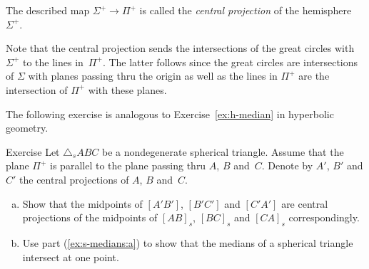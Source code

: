 The described map $\Sigma^+\to \Pi^+$ is called the \emph{central projection} of 
the hemisphere~$\Sigma^+$.

Note that the central projection sends the intersections of the great circles with $\Sigma^+$ to the lines in~$\Pi^+$.
The latter follows since the great circles are intersections of $\Sigma$ with planes passing thru the origin
as well as the lines in $\Pi^+$ are the intersection of $\Pi^+$ with these planes.

The following exercise 
is analogous to Exercise~\ref{ex:h-median}
in hyperbolic geometry.

\begin{thm}{Exercise}\label{ex:s-medians}
Let $\triangle_sABC$ be a nondegenerate spherical triangle.
Assume that the plane $\Pi^+$ is parallel to the plane passing thru $A$, $B$ and~$C$.
Denote by $A'$, $B'$ and $C'$ the central projections of $A$, $B$ and~$C$.
\begin{enumerate}[(a)]
\item\label{ex:s-medians:a} Show that the midpoints of $[A'B']$, $[B'C']$ and $[C'A']$
are central projections of the midpoints of $[AB]_s$, $[BC]_s$ and $[CA]_s$ correspondingly.
\item\label{ex:s-medians:b} Use part (\ref{ex:s-medians:a}) to show that the medians of a spherical triangle intersect at one point.
\end{enumerate}

\end{thm}





